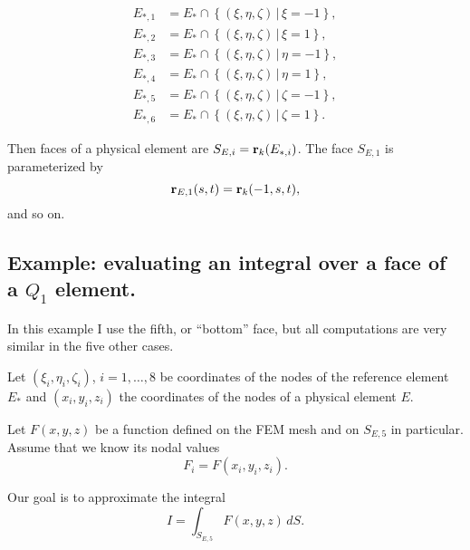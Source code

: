 \documentclass[11pt]{article}
\begin{document}
\begin{equation}
\label{eq:20}
\begin{aligned}
E_{*,1} &=  E_{*} \cap \left \{ (\xi, \eta, \zeta)\, |\, \xi = -1 \right \},\\
E_{*,2} &=  E_{*} \cap \left \{ (\xi, \eta, \zeta)\, |\, \xi = 1  \right \},\\
E_{*,3} &=  E_{*} \cap \left \{ (\xi, \eta, \zeta)\, |\, \eta = -1 \right \},\\
E_{*,4} &=  E_{*} \cap \left \{ (\xi, \eta, \zeta)\, |\, \eta = 1  \right \},\\
E_{*,5} &=  E_{*} \cap \left \{ (\xi, \eta, \zeta)\, |\, \zeta = -1 \right \},\\
E_{*,6} &=  E_{*} \cap \left \{ (\xi, \eta, \zeta)\, |\, \zeta = 1  \right \}.
\end{aligned}
\end{equation}

Then faces of a physical element are $S_{E,i} = \mathbf{r}_{k}(E_{*,i})$.
The face $S_{E,1}$ is parameterized by
\begin{equation*}
\label{eq:21}
\mathbf{r}_{E,1}(s, t) = \mathbf{r}_{k}(-1,s,t),
\end{equation*}
and so on.

\subsection{Example: evaluating an integral over a face of a $Q_{1}$ element.}
\label{sec-4-1}

\newcommand{\face}{S_{E,5}}

In this example I use the fifth, or ``bottom'' face, but all
computations are very similar in the five other cases.

Let $(\xi_{i}, \eta_{i}, \zeta_{i})$, $i = 1,\dots,8$ be coordinates
of the nodes of the reference element $E_{*}$ and $(x_{i}, y_{i},
z_{i})$ the coordinates of the nodes of a physical element $E$.

Let $F(x,y,z)$ be a function defined on the FEM mesh and on $\face$
in particular. Assume that we know its nodal values
\begin{equation*}
F_{i} = F(x_{i}, y_{i}, z_{i}).
\end{equation*}

Our goal is to approximate the integral
\begin{equation}
\label{eq:22}
I = \int_{\face} F(x,y,z)\, dS.
\end{equation}
\end{document}
